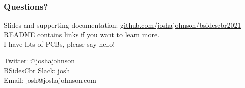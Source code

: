 \documentclass[aspectratio=169, t]{beamer}
\begin{document}
\begin{frame}
\frametitle{Questions?}
Slides and supporting documentation: \url{github.com/joshajohnson/bsidescbr2021}\\[10pt]
README contains links if you want to learn more.\\[10pt]
I have lots of PCBs, please say hello!\\[10pt]
\vspace{5mm}

Twitter: @\textunderscore joshajohnson\\
BSidesCbr Slack: josh\\
Email: josh@joshajohnson.com\\
\vspace{4mm}
\end{frame}
\end{document}
